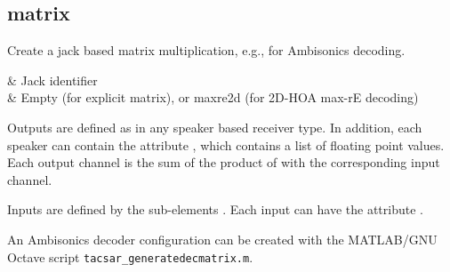 \subsection{matrix}\label{sec:matrix}

Create a jack based matrix multiplication, e.g., for Ambisonics decoding.

\begin{tscattributes}
 & Jack identifier\\
 & Empty (for explicit matrix), or maxre2d (for 2D-HOA max-rE decoding)\\
\end{tscattributes}

Outputs are defined as in any speaker based receiver type. 
%
In addition, each speaker can contain the attribute , which
contains a list of floating point values.
%
Each output channel is the sum of the product of  with the
corresponding input channel.

Inputs are defined by the sub-elements .
%
Each input can have the attribute .

An Ambisonics decoder configuration can be created with the MATLAB/GNU
Octave script \verb!tacsar_generatedecmatrix.m!.

